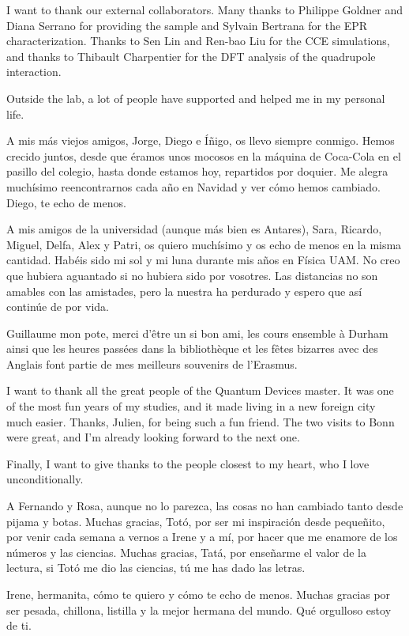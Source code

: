 I want to thank our external collaborators. Many thanks to Philippe Goldner and Diana Serrano for providing the \Ca sample and Sylvain Bertrana for the EPR characterization. Thanks to Sen Lin and Ren-bao Liu for the CCE simulations, and thanks to Thibault Charpentier for the DFT analysis of the quadrupole interaction.

Outside the lab, a lot of people have supported and helped me in my personal life.

A mis más viejos amigos, Jorge, Diego e Íñigo, os llevo siempre conmigo. Hemos crecido juntos, desde que éramos unos mocosos en la máquina de Coca-Cola en el pasillo del colegio, hasta donde estamos hoy, repartidos por doquier. Me alegra muchísimo reencontrarnos cada año en Navidad y ver cómo hemos cambiado. Diego, te echo de menos.

A mis amigos de la universidad (aunque más bien es Antares), Sara, Ricardo, Miguel, Delfa, Alex y Patri, os quiero muchísimo y os echo de menos en la misma cantidad. Habéis sido mi sol y mi luna durante mis años en Física UAM. No creo que hubiera aguantado si no hubiera sido por vosotres. Las distancias no son amables con las amistades, pero la nuestra ha perdurado y espero que así continúe de por vida.

Guillaume mon pote, merci d'être un si bon ami, les cours ensemble à Durham ainsi que les heures passées dans la bibliothèque et les fêtes bizarres avec des Anglais font partie de mes meilleurs souvenirs de l'Erasmus.

I want to thank all the great people of the Quantum Devices master. It was one of the most fun years of my studies, and it made living in a new foreign city much easier. Thanks, Julien, for being such a fun friend. The two visits to Bonn were great, and I'm already looking forward to the next one.

Finally, I want to give thanks to the people closest to my heart, who I love unconditionally.

A Fernando y Rosa, aunque no lo parezca, las cosas no han cambiado tanto desde pijama y botas. Muchas gracias, Totó, por ser mi inspiración desde pequeñito, por venir cada semana a vernos a Irene y a mí, por hacer que me enamore de los números y las ciencias. Muchas gracias, Tatá, por enseñarme el valor de la lectura, si Totó me dio las ciencias, tú me has dado las letras.

Irene, hermanita, cómo te quiero y cómo te echo de menos. Muchas gracias por ser pesada, chillona, listilla y la mejor hermana del mundo. Qué orgulloso estoy de ti.

